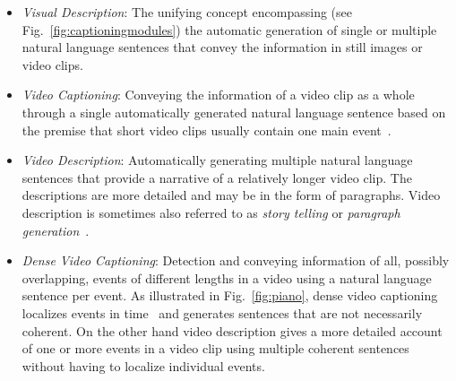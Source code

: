 \documentclass[10pt,journal,compsoc]{IEEEtran}
\begin{document}
\begin{itemize}
\item {\it Visual Description}: The unifying concept encompassing (see Fig.~\ref{fig:captioningmodules}) the automatic generation of single or multiple natural language sentences that convey the information in still images or video clips.


\item {\it Video Captioning}: Conveying the information of a video clip as a whole through a single automatically generated natural language sentence based on the premise that short video clips usually contain one main event~\cite{gan2017semantic, yao2015describing, venugopalan2015sequence, ballas2015delving, Pan_2017_CVPR, donahue2015long}. 

\item {\it Video Description}: Automatically generating multiple natural language sentences that provide a narrative of a relatively longer video clip. The descriptions are more detailed and may be in the form of paragraphs. Video description is sometimes also referred to as \textit{story telling} or \textit{paragraph generation}~\cite{yu2016video, rohrbach2014coherent}.


\item {\it Dense Video Captioning}: Detection and conveying information of all, possibly overlapping, events of different lengths in a video using a natural language sentence per event. As illustrated in Fig.~\ref{fig:piano}, dense video captioning localizes events in time~\cite{krishna2017dense, yaomsr, ruccmu, xu2018joint} and generates sentences that are not necessarily coherent. On the other hand video description gives a more detailed account of one or more events in a video clip using multiple coherent sentences without having to localize individual events.
\end{itemize}
\end{document}

